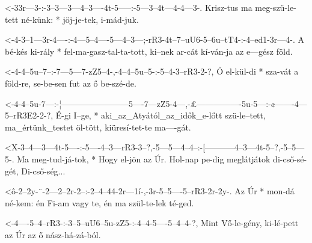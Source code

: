 



  {<-33r---3-:-3--3---3---4--3----4t-5-----:-5---3--4t---4-4---3-.}
  {  Krisz-tus ma meg-szü-le-tett né-künk: * jöj-je-tek, i-mád-juk.}



  {<-4-3--1---3r-4----:-4---5--4----5---4--3---;-rR3-4t--7--uU6-5--6u--tT4-:-4--ed1-3r---4-.}
  {  A bé-kés ki-rály * fel-ma-gasz-tal-ta-tott, ki--nek ar-cát kí-ván-ja    az e---gész föld.}

  {<-4-4--5u--7--:-7---5---7-zZ5--4-,-4--4--5u--5-:-5--4-3--rR3-2-?,}
  {  Ő el-kül-di * sza-vát a föld-re, se-be-sen fut az ő be-szé-de.}

  {<-4-4--5u-7---:-¦------------------------5----7---zZ5-4---,-£----------------5u-5---:-¢-------4---5--rR3E2-2-?,}
  {  É-gi I--ge, * aki_az_Atyától_az_idők_e-lőtt szü-le--tett, ma_értünk_testet öl-tött, kiüresí-tet-te ma----gát.}

  {<X-3--4---3---4t-5----:-5----4--3---rR3-3--?,-5---5---4--4--:-[-----------4--3---4t-5--?,-5--5---5-.}
  {   Ma meg-tud-já-tok, * Hogy el-jön az  Úr.   Hol-nap pe-dig  meglátjátok di-cső-sé-gét,  Di-cső-ség...}


  {<ô-2--2y-¨-2---2--2r-2--:-2--4--44-2r---1í-,-3r-5--5----5--rR3-2r-2y-.}
  {   Az Úr * mon-dá né-kem: én Fi-am vagy te,  én ma szül-te-lek té-ged.}

  {<-4----5--4--rR3-:-3--5--uU6--5u-zZ5-:-4--4-5----5--4--4-?,}
  {  Mint Vő-le-gény, ki-lé-pett az Úr    az ő nász-há-zá-ból.}

